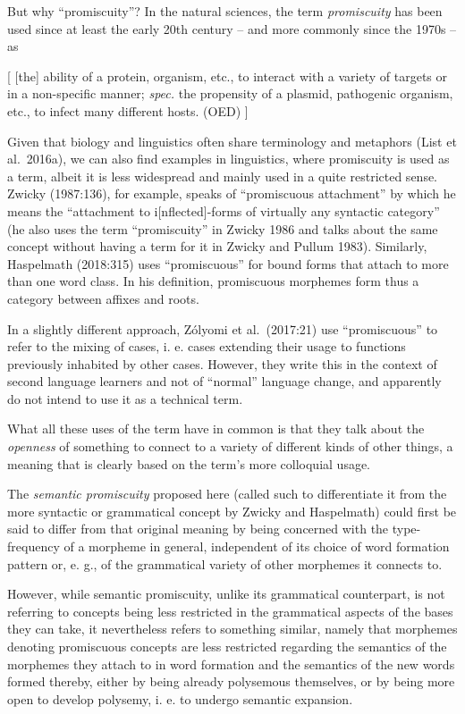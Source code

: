 \documentclass[
  english,
  a4paper,
  oneside,tablecaptionabove
]{scrbook}
\begin{document}
But why \enquote{promiscuity}? In the natural sciences, the term
\emph{promiscuity} has been used since at least the early 20th century
-- and more commonly since the 1970s -- as

{[} {[}the{]} ability of a protein, organism, etc., to interact with a
variety of targets or in a non-specific manner; \emph{spec.} the
propensity of a plasmid, pathogenic organism, etc., to infect many
different hosts. (OED) {]}

Given that biology and linguistics often share terminology and metaphors
(List et al.~2016a), we can also find examples in linguistics, where
promiscuity is used as a term, albeit it is less widespread and mainly
used in a quite restricted sense. Zwicky (1987:136), for example, speaks
of \enquote{promiscuous attachment} by which he means the
\enquote{attachment to i{[}nflected{]}-forms of virtually any syntactic
category} (he also uses the term \enquote{promiscuity} in Zwicky 1986
and talks about the same concept without having a term for it in Zwicky
and Pullum 1983). Similarly, Haspelmath (2018:315) uses
\enquote{promiscuous} for bound forms that attach to more than one word
class. In his definition, promiscuous morphemes form thus a category
between affixes and roots.

In a slightly different approach, Zólyomi et al.~(2017:21) use
\enquote{promiscuous} to refer to the mixing of cases, i. e. cases
extending their usage to functions previously inhabited by other cases.
However, they write this in the context of second language learners and
not of \enquote{normal} language change, and apparently do not intend to
use it as a technical term.

What all these uses of the term have in common is that they talk about
the \emph{openness} of something to connect to a variety of different
kinds of other things, a meaning that is clearly based on the term's
more colloquial usage.

The \emph{semantic promiscuity} proposed here (called such to
differentiate it from the more syntactic or grammatical concept by
Zwicky and Haspelmath) could first be said to differ from that original
meaning by being concerned with the type-frequency of a morpheme in
general, independent of its choice of word formation pattern or, e. g.,
of the grammatical variety of other morphemes it connects to.

However, while semantic promiscuity, unlike its grammatical counterpart,
is not referring to concepts being less restricted in the grammatical
aspects of the bases they can take, it nevertheless refers to something
similar, namely that morphemes denoting promiscuous concepts are less
restricted regarding the semantics of the morphemes they attach to in
word formation and the semantics of the new words formed thereby, either
by being already polysemous themselves, or by being more open to develop
polysemy, i. e. to undergo semantic expansion.
\end{document}
